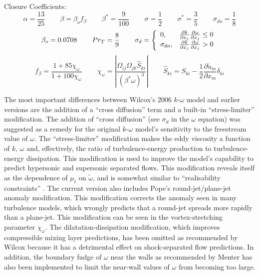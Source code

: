 Closure Coefficients:
\begin{equation}
\alpha = \frac{13}{25}
\, \, \, \, \, \, \, \, \, \, \, \, \,
\beta = \beta_{o} f_{\beta}
\, \, \, \, \, \, \, \, \, \, \, \, \,
\beta^{\ast} = \frac{9}{100}
\, \, \, \, \, \, \, \, \, \, \, \, \,
\sigma = \frac{1}{2}
\, \, \, \, \, \, \, \, \, \, \, \, \,
\sigma^{\ast} = \frac{3}{5}
\, \, \, \, \, \, \, \, \, \, \, \, \,
\sigma_{do} = \frac{1}{8}
\end{equation}
\begin{equation}
\beta_{o} = 0.0708
\, \, \, \, \, \, \, \, \, \, \, \, \,
Pr_T = \frac{8}{9}
\, \, \, \, \, \, \, \, \, \, \, \, \,
\sigma_{d} = \left \{
 \begin{array}{l l}
 0, & \frac{\partial k}{\partial x_j} \frac{\partial \omega}{\partial x_j} \leq 0\\
 \sigma_{do}, & \frac{\partial k}{\partial x_j} \frac{\partial \omega}{\partial x_j} > 0
 \end{array} \right .
\end{equation}
\begin{equation}
f_{\beta} = \frac{1 + 85\chi_{\omega}}{1 + 100\chi_{\omega}}
\, \, \, \, \, \, \, \, \, \, \, \, \,
\chi_{\omega} = \left | \frac{\Omega_{ij}\Omega_{jk}\hat{S}_{ki}}{\left(\beta^{\ast}\omega\right)^3} \right |
\, \, \, \, \, \, \, \, \, \, \, \, \,
\hat{S}_{ki} = S_{ki} - \frac{1}{2}\frac{\partial \tilde{u}_m}{\partial x_m} \delta_{ki}
\end{equation}
\vspace{0.5cm}

The most important differences between Wilcox's 2006 $k$-$\omega$ model
and earlier versions are the addition of a ``cross diffusion'' term and a 
built-in ``stress-limiter'' modification. The addition of ``cross diffusion'' 
(see $\sigma_d$ in the $\omega$ equation) 
was suggested as a remedy for the original $k$-$\omega$ model's sensitivity
to the freestream value of $\omega$. The ``stress-limiter'' modification
makes the eddy viscosity a function of $k$, $\omega$ and, effectively, the
ratio of turbulence-energy production to turbulence-energy dissipation.
This modification is used to improve the model's capability to predict 
hypersonic and supersonic separated flows. This modification reveals
itself as the dependence of $\mu_t$ on $\tilde{\omega}$, and is somewhat
similar to ``realisability constraints'' \cite{Moore1999}. %
The current version also includes Pope's \cite{Pope1978} round-jet/plane-jet 
anomaly modification. This modification corrects the anomaly seen in many 
turbulence models, which wrongly predicts that a round-jet spreads more 
rapidly than a plane-jet. This modification can be seen in the 
vortex-stretching parameter $\chi_{\omega}$. The dilatation-dissipation 
modification, which improves compressible mixing layer predictions, has 
been omitted as recommended by Wilcox \cite{Wilcox2006} because it has a
detrimental effect on shock-separated flow predictions.
In addition, the boundary fudge of $\omega$ near the walls as recommended
by Menter \cite{Menter1994} has also been implemented to limit the near-wall values of
$\omega$ from becoming too large. %

